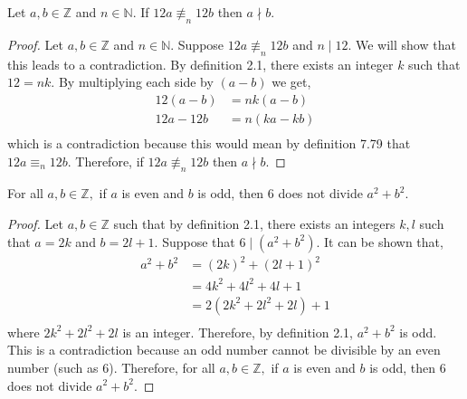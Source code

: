 \documentclass[12pt]{article}
\newenvironment{theorem}[2][Theorem]{\begin{trivlist}
\item[\hskip \labelsep {\bfseries #1}\hskip \labelsep {\bfseries #2.}]}{\end{trivlist}}
\begin{document}
\section{}
\begin{theorem}{7 (assuming conclusion?)} 
	Let $a,b \in \mathbb{Z}$ and $n \in \mathbb{N}$. If $12a \not\equiv_n 12b$ then $a \nmid b$.
\end{theorem}
	\begin{proof}
		Let $a,b \in \mathbb{Z}$ and $n \in \mathbb{N}$. Suppose $12a \not\equiv_n 12b$ and $n\mid12$. We will
		show that this leads to a contradiction. By definition 2.1, there exists an integer $k$ such that
		$12=nk$. By multiplying each side by $(a-b)$ we get,
		\begin{align*}
			12(a-b) &= nk(a-b)\\
			12a-12b &= n(ka-kb)\\
		\end{align*}
		which is a contradiction because this would mean by definition 7.79 that
		$12a \equiv_n 12b$. Therefore, if $12a \not\equiv_n 12b$ then $a \nmid b$.
\end{proof}
\begin{theorem}{8} 
	For all $a,b \in \mathbb{Z},$ if $a$ is even and $b$ is odd, then 6 does not 
	divide $a^2+b^2$.
\end{theorem}
	\begin{proof}
		Let $a,b \in \mathbb{Z}$ such that by definition 2.1, there exists an integers $k,l$ such that $a=2k$ and $b=2l+1$.
		Suppose that $6\mid(a^2+b^2)$. It can be shown that, 
		\begin{align*}
			a^2+b^2&=(2k)^2+(2l+1)^2\\
			       &=4k^2+4l^2+4l+1\\
				      &=2(2k^2+2l^2+2l)+1\\
		\end{align*}
		where $2k^2+2l^2+2l$ is an integer. 
		Therefore, by definition 2.1, $a^2+b^2$ is odd. This is a contradiction because
		an odd number cannot be divisible by an even number (such as 6). Therefore, for all $a,b \in \mathbb{Z},$ if $a$ is even and $b$ is odd, then 6 does not
		divide $a^2+b^2$.
		

\end{proof}
		
\end{document}
